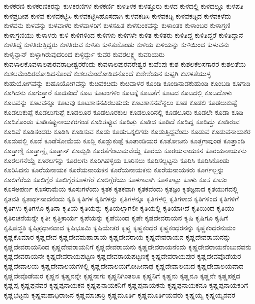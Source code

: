{ಕುಳಕರಣಿ
ಕುಳಕರಣಿಕರನ್ನು
ಕುಳಕರಣಿಗಳ
ಕುಳಕರ್ಣಿ
ಕುಳತಿಳಕ
ಕುಳತ್ತೂರು
ಕುಳದ
ಕುಳದಲ್ಲಿ
ಕುಳದಲ್ಲೂ
ಕುಳಪತಿ
ಕುಳಪ್ರದೀಪ
ಕುಳವ
ಕುಳವಕಟ್ಟಿಸಿ
ಕುಳವಕಟ್ಟಿಸಿಹೊಸದಾಗಿ
ಕುಳವಕಡಿಸಿ
ಕುಳವಕಡ್ಸಿ
ಕುಳವಕಡ್ಸಿದ
ಕುಳವಕಳೆದು
ಕುಳವನು
ಕುಳವನ್ನು
ಕುಳವಾಳರ
ಕುಳವಾಳರಿಗೆ
ಕುಳಸಹಿತ
ಕುಳಸುಂಕವನ್ನು
ಕುಳಾಂತಕ
ಕುಳಾಂಬರ
ಕುಳಾಗ್ರಣಿ
ಕುಳಾಗ್ರಣಿಯು
ಕುಳಾಳರು
ಕುಳಿ
ಕುಳಿಗಳಿಂದ
ಕುಳಿಗಳು
ಕುಳಿಗಳೇ
ಕುಳಿತ
ಕುಳಿತರು
ಕುಳಿತಿದ್ದ
ಕುಳಿತಿದ್ದರೆ
ಕುಳಿತಿದ್ದಾನೆ
ಕುಳಿತಿದ್ದೆ
ಕುಳಿತಿರುತ್ತಿದ್ದರು
ಕುಳಿತಿರುವ
ಕುಳಿತು
ಕುಳಿತುಕೊಂಡು
ಕುಳಿಯ
ಕುಳಿಯನ್ನು
ಕುಳಿಯಿಂದ
ಕುಳುವನು
ಕುಳೈನ್ದಾನ್
ಕುಳ್ಳಾಗಿರುವುದರಿಂದ
ಕುಳ್ಳಿರ್ದ್ದು
ಕುವರ
ಕುವರಲಕ್ಷ್ಮ
ಕುವರಿಯರು
ಕುವಳಾಲಕೊವಳಾಲಪುರವರಾಧೀಶ್ವರರೆಂದು
ಕುವಳಾಲಪುರವರೇಶ್ವರ
ಕುವೆಂಪು
ಕುಶ
ಕುಶಲಕೆಲಸಗಾರರ
ಕುಶಲತೆಯ
ಕುಶಲಮೆಂದಿರದೋಡಿದನೊಂದೆ
ಕುಶಲಮೆಂದೋಡಿದನೊಂದೆ
ಕುಶೇಶೆಯನ
ಕುಷ್ಟಗಿ
ಕುಸಳತೆಯುಳ್ಳ
ಕುಹುಯೋಗವನ್ನು
ಕುಹೂಯೋಗವನ್ನು
ಕುೞವಕೞದು
ಕುೞವಾಳರ
ಕೂಂಡಿ
ಕೂಂಡಿನಾಡಕುಹುಂಡಿ
ಕೂಂಬಡಿ
ಕೂಗಾಡಿ
ಕೂಗಿದನು
ಕೂಗುತ್ತಾರೆ
ಕೂಚಿತಂದೆ
ಕೂಟ
ಕೂಟಂಗಳಿಂ
ಕೂಟಕ್ಕೆ
ಕೂಟತೆಗೆ
ಕೂಟದ
ಕೂಟದಲ್ಲಿ
ಕೂಟದೊಳು
ಕೂಟವನ್ನು
ಕೂಟವನ್ನೂ
ಕೂಟವು
ಕೂಟಶಾಸನವಿರಬಹುದು
ಕೂಟಶಾಸನವೆನ್ನಲು
ಕೂಡ
ಕೂಡಲಿ
ಕೂಡಲುಕುಪ್ಟೆ
ಕೂಡಲುಕುಪ್ಪೆ
ಕೂಡಲುಗುಪ್ಪೆ
ಕೂಡಲೂರ
ಕೂಡಲೂರಕುಲ
ಕೂಡಲೂರಿನಲ್ಲಿ
ಕೂಡಲೂರು
ಕೂಡಲೇ
ಕೂಡಾ
ಕೂಡಿ
ಕೂಡಿಕೊಂಡು
ಕೂಡಿತಪ್ಪುನಾಯಕರಗಂಡ
ಕೂಡಿತಪ್ಪುವ
ಕೂಡಿತ್ತು
ಕೂಡಿದ
ಕೂಡಿದೆ
ಕೂಡಿದ್ದ
ಕೂಡಿದ್ದು
ಕೂಡಿರುವ
ಕೂಡಿವೆ
ಕೂಡಿಸಂದರು
ಕೂಡಿಸಿ
ಕೂಡಿಸುವ
ಕೂಡು
ಕೂಡುಒಕ್ಕಲಿಗರು
ಕೂಡುತ್ತಿದ್ದವೆಂದು
ಕೂಡುವ
ಕೂಡುವನಾಯಕರ
ಕೂಡುವಲ್ಲಿ
ಕೂಡೆ
ಕೂಡೆಸೋಮೆಯ
ಕೂಡ್ಲಿ
ಕೂಡ್ಲುಕುಪ್ಪೆ
ಕೂತಾಂಡಿಯರ
ಕೂತೋಜನು
ಕೂತ್ತಗಾವುಂಡ
ಕೂತ್ತಾಂಡಿ
ಕೂತ್ತಾಣ್ಡಿ
ಕೂತ್ತಾಣ್ಡೈ
ಕೂತ್ತಾನ್
ಕೂಮ್ಬಡಿ
ಕೂರತೆಗೆಂಟುಮವೆಯ್ದೆ
ಕೂರಯ
ಕೂರಯನಾಯಕನ
ಕೂರಯನಾಯಕನು
ಕೂರಲಗನೆಯ್ದೆ
ಕೂರಲಗನ್ನು
ಕೂರಲಗು
ಕೂರಿಗಿಹಳ್ಳಿಯ
ಕೂರಿಸಲು
ಕೂರಿಸಲ್ಪಟ್ಟನು
ಕೂರಿಸಿ
ಕೂರಿಸಿಕೊಂಡು
ಕೂರಿಸಿದನು
ಕೂರೆಯನಾಯಕ
ಕೂರೆಯನಾಯಕನ
ಕೂರೆಯನಾಯಕನು
ಕೂರೆಯನಾಯಕರು
ಕೂರ್ಗಲ್ಲನ್ನು
ಕೂಲಿಗೆರೆಯ
ಕೂಲಿಗ್ಗೆರೆ
ಕೂಲಿಗ್ಗೆರೆಕೂಳಗೆರೆ
ಕೂಲಿಗ್ಗೆರೆಯು
ಕೂಳಣವಾಗಿ
ಕೂಳಿಕಾಟ್ಟು
ಕೂಳು
ಕೂಸ
ಕೂಸಂ
ಕೂಸಅಪರ್ಣ
ಕೂಸರಾಮೆಯ
ಕೂಸುಗಳೆಂದು
ಕೃತಕ
ಕೃತಕವಾಗಿ
ಕೃತಕವೆಂದು
ಕೃತಜ್ಞಂ
ಕೃತಜ್ಞನಾದ
ಕೃತಯುಗದಲ್ಲಿ
ಕೃತವತಿ
ಕೃತಾರ್ಥನಾದನೆಂದು
ಕೃತಿ
ಕೃತಿಗಳ
ಕೃತಿಗಳನ್ನು
ಕೃತಿಗಳನ್ನೂ
ಕೃತಿಗಳಲ್ಲಿ
ಕೃತಿಗಳಾದ
ಕೃತಿಗಳಿಂದ
ಕೃತಿಗಳಿಗೆ
ಕೃತಿಗಳು
ಕೃತಿಗಳೂ
ಕೃತಿನಾ
ಕೃತಿಯ
ಕೃತಿಯನ್ನು
ಕೃತಿಯಲ್ಲಾಗಲೀ
ಕೃತಿಯಲ್ಲಿ
ಕೃತಿಯಾಗಿದೆ
ಕೃತಿಯಿಂದ
ಕೃತಿಯು
ಕೃತಿರಚನೆಯನ್ನೇ
ಕೃತೀ
ಕೃತ್ತಿಕಾರ್ಯ
ಕೃಪೆಯನ್ನು
ಕೃಪೆಯಿಂದ
ಕೃಪೇ
ಕೃಷದೇವರಾಯನ
ಕೃಷಿ
ಕೃಷಿಗೂ
ಕೃಷಿಗೆ
ಕೃಷಿಪದ್ಧತಿ
ಕೃಷಿಪ್ರಧಾನವಾದ
ಕೃಷಿಭೂಮಿ
ಕೃಷಿಯೇತರ
ಕೃಷ್ಣ
ಕೃಷ್ಣಕಂಧರ
ಕೃಷ್ಣಕಂಧರನನ್ನು
ಕೃಷ್ಣಕಂಧರನುಮಂ
ಕೃಷ್ಣಕೊಮಾರ
ಕೃಷ್ಣದೇವ
ಕೃಷ್ಣದೇವಮಹಾರಾಯ
ಕೃಷ್ಣದೇವರಾಯ
ಕೃಷ್ಣದೇವರಾಯನ
ಕೃಷ್ಣದೇವರಾಯನನ್ನು
ಕೃಷ್ಣದೇವರಾಯನಿಂದ
ಕೃಷ್ಣದೇವರಾಯನಿಗೆ
ಕೃಷ್ಣದೇವರಾಯನು
ಕೃಷ್ಣದೇವರಾಯನೆಂದು
ಕೃಷ್ಣದೇವರಾಯನೆಂಬುವವನು
ಕೃಷ್ಣದೇವರಾಯನೇ
ಕೃಷ್ಣದೇವರಾಯಪಟ್ಟಣ
ಕೃಷ್ಣದೇವರಾಯಪಟ್ಟಣಕ್ಕೆ
ಕೃಷ್ಣದೇವರಾಯಪುರ
ಕೃಷ್ಣದೇವವೊಡೆಯರ
ಕೃಷ್ಣದೇವಾಲಯ
ಕೃಷ್ಣದೇವಾಲಯಗಳಲ್ಲಿ
ಕೃಷ್ಣದೇವಾಲಯಗೋಪೀನಾಥ
ಕೃಷ್ಣದೇವಾಲಯದ
ಕೃಷ್ಣದೇವಾಲಯವಾದ
ಕೃಷ್ಣದೇವೊಡೆಯರ
ಕೃಷ್ಣನ
ಕೃಷ್ಣನನ್ನೇ
ಕೃಷ್ಣನಾಗು
ಕೃಷ್ಣನಿಗಿಂತಲೂ
ಕೃಷ್ಣನಿಗೆ
ಕೃಷ್ಣನು
ಕೃಷ್ಣನೂ
ಕೃಷ್ಣನೇ
ಕೃಷ್ಣಪಕ್ಷದ
ಕೃಷ್ಣಪ್ಪ
ಕೃಷ್ಣಪ್ಪನವರ
ಕೃಷ್ಣಪ್ಪನಾಯಕನ
ಕೃಷ್ಣಪ್ಪನಾಯಕನಿಗೆ
ಕೃಷ್ಣಪ್ಪನಾಯಕನು
ಕೃಷ್ಣಪ್ಪನಾಯಕನೂ
ಕೃಷ್ಣಪ್ಪನಾಯಕರಿಗೆ
ಕೃಷ್ಣಭಟ್ಟನು
ಕೃಷ್ಣಮಹಾಧಿರಾಜನ
ಕೃಷ್ಣಮಾಚಾರ್ರಿ
ಕೃಷ್ಣಮೂರ್ತಿ
ಕೃಷ್ಣಮೂರ್ತಿಯವರು
ಕೃಷ್ಣಯ್ಯ
ಕೃಷ್ಣಯ್ಯನವರ
}
